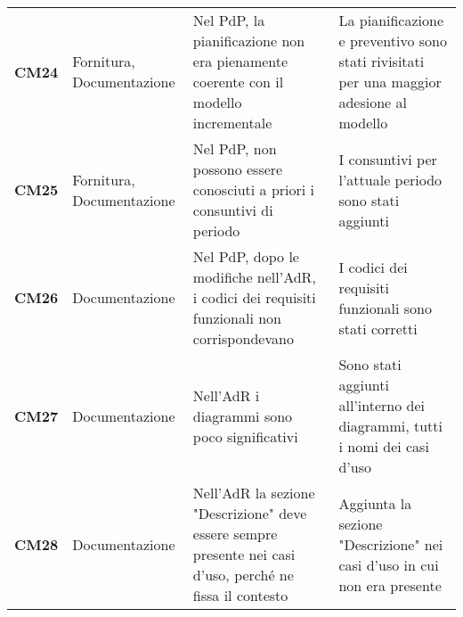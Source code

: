 \documentclass[../piano-di-qualifica.tex]{subfiles}
\begin{document}
\begin{longtable}[H]{>{\centering\bfseries}m{2.5cm} >{\centering}m{2.5cm} >{\centering}m{5.5cm} >{\centering\arraybackslash}m{5.5cm}}
CM24 & Fornitura, Documentazione                     & Nel PdP, la pianificazione non era pienamente coerente con il modello incrementale                                                                                            & La pianificazione e preventivo sono stati rivisitati per una maggior adesione al modello                                                                                                                                                                                                                                                            \\
CM25 & Fornitura, Documentazione                     & Nel PdP, non possono essere conosciuti a priori i consuntivi di periodo                                                                                                       & I consuntivi per l’attuale periodo sono stati aggiunti                                                                                                                                                                                                                                                                                              \\
CM26 & Documentazione                                & Nel PdP, dopo le modifiche nell’AdR, i codici dei requisiti funzionali non corrispondevano                                                                                    & I codici dei requisiti funzionali sono stati corretti                                                                                                                                                                                                                                                                                               \\
CM27 & Documentazione                                & Nell'AdR i diagrammi sono poco significativi                                                                                                                                  & Sono stati aggiunti all'interno dei diagrammi, tutti i nomi dei casi d'uso                                                                                                                                                                                                                                                                          \\
CM28 & Documentazione                                & Nell’AdR la sezione "Descrizione" deve essere sempre presente nei casi d’uso, perché ne fissa il contesto                                                                     & Aggiunta la sezione "Descrizione" nei casi d’uso in cui non era presente                                                                                                                                                                                                                                                                            \\

\end{longtable}
\end{document}
